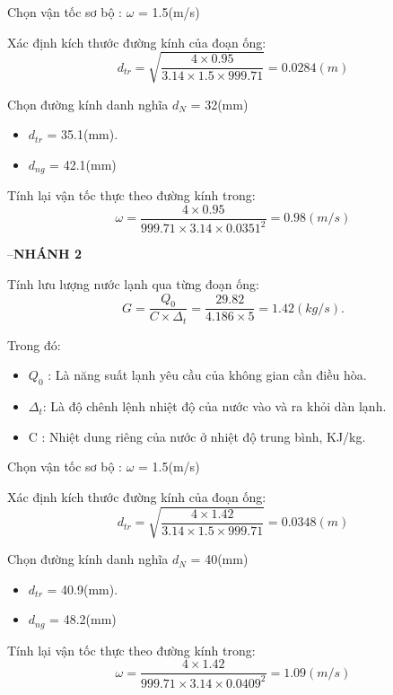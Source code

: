 Chọn vận tốc sơ bộ : $\omega$ = 1.5(m/s)

Xác định kích thước đường kính của đoạn ống:
\begin{equation*}
	d_{tr} = \sqrt{\dfrac{4 \times 0.95}{3.14 \times 1.5 \times 999.71}} = 0.0284(m)
\end{equation*}

Chọn đường kính danh nghĩa $d_{N}$ = 32(mm)
\begin{itemize}
	\item $d_{tr}$ = 35.1(mm).
	\item $d_{ng}$ = 42.1(mm)
\end{itemize}

Tính lại vận tốc thực theo đường kính trong:
\begin{equation*}
	\omega = \dfrac{4 \times 0.95 }{999.71 \times 3.14 \times 0.0351^{2}} = 0.98(m/s)
\end{equation*}

\newpage

--\textbf{NHÁNH 2}

Tính lưu lượng nước lạnh qua từng đoạn ống:
\begin{equation*}
	G = \dfrac{Q_{0}}{C \times \Delta_{t}} =\dfrac{29.82}{4.186 \times 5} = 1.42(kg/s).
\end{equation*}

Trong đó:
\begin{itemize}
	\item $Q_{0}$ : Là năng suất lạnh yêu cầu của không gian cần điều hòa.
	\item $\Delta_{t}$: Là độ chênh lệnh nhiệt độ của nước vào và ra khỏi dàn lạnh.
	\item C : Nhiệt dung riêng của nước ở nhiệt độ trung bình, KJ/kg.
\end{itemize}

Chọn vận tốc sơ bộ : $\omega$ = 1.5(m/s)

Xác định kích thước đường kính của đoạn ống:
\begin{equation*}
	d_{tr} = \sqrt{\dfrac{4 \times 1.42}{3.14 \times 1.5 \times 999.71}} = 0.0348(m)
\end{equation*}

Chọn đường kính danh nghĩa $d_{N}$ = 40(mm)
\begin{itemize}
	\item $d_{tr}$ = 40.9(mm).
	\item $d_{ng}$ = 48.2(mm)
\end{itemize}

Tính lại vận tốc thực theo đường kính trong:
\begin{equation*}
	\omega = \dfrac{4 \times 1.42 }{999.71 \times 3.14 \times 0.0409^{2}} = 1.09(m/s)
\end{equation*}

